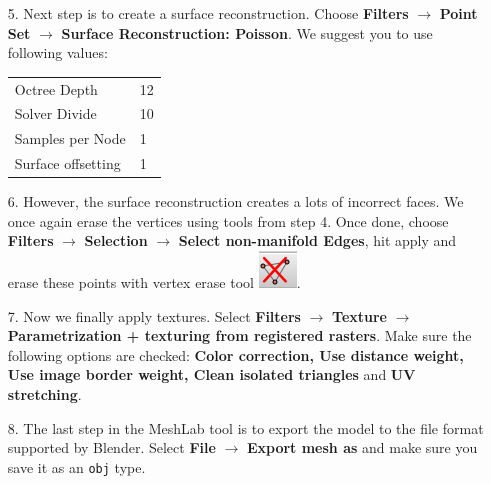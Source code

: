 \begin{itemize}
	\item[5.] Next step is to create a surface reconstruction. Choose \textbf{Filters} $\rightarrow$ \textbf{Point Set} $\rightarrow$ \textbf{Surface Reconstruction: Poisson}. We suggest you to use following values:
	
	\begin{tabular}{l l}
		Octree Depth & 12 \\
		Solver Divide & 10 \\
		Samples per Node & 1 \\
		Surface offsetting & 1 \\
	\end{tabular}
	

	\item[6.] However, the surface reconstruction creates a lots of incorrect faces. We once again erase the vertices using tools from step 4. Once done, choose \textbf{Filters} $\rightarrow$ \textbf{Selection} $\rightarrow$ \textbf{Select non-manifold Edges}, hit apply and erase these points with vertex erase tool \includegraphics[keepaspectratio,width=.5cm]{fig/meshlab-delete.png}.
	
	\item[7.] Now we finally apply textures. Select \textbf{Filters} $\rightarrow$ \textbf{Texture} $\rightarrow$ \textbf{Parametrization + texturing from registered rasters}. Make sure the following options are checked: \textbf{Color correction, Use distance weight, Use image border weight, Clean isolated triangles} and \textbf{UV stretching}.
	\item[8.] The last step in the MeshLab tool is to export the model to the file format supported by Blender. Select \textbf{File} $\rightarrow$ \textbf{Export mesh as} and make sure you save it as an \texttt{obj} type.
\end{itemize}

